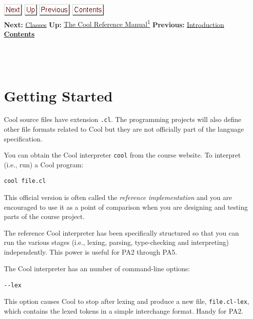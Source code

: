 \documentclass[]{article}
\begin{document}
\href{node4.html}{\includegraphics{next.png}}
\href{cool-manual.html}{\includegraphics{up.png}}
\href{node2.html}{\includegraphics{prev.png}}
\href{node1.html}{\includegraphics{contents.png}} \\ \textbf{Next:}
\href{node4.html}{Classes} \textbf{Up:} \href{cool-manual.html}{The Cool
Reference Manual\textsuperscript{1}} \textbf{Previous:}
\href{node2.html}{Introduction} ~ \textbf{\href{node1.html}{Contents}}
\\ \\

\section{\\ Getting Started}

Cool source files have extension \texttt{.cl}. The programming projects
will also define other file formats related to Cool but they are not
officially part of the language specification.

You can obtain the Cool interpreter \texttt{cool} from the course
website. To interpret (i.e., run) a Cool program:

\begin{verbatim}
cool file.cl 
\end{verbatim}

This official version is often called the \emph{reference
implementation} and you are encouraged to use it as a point of
comparison when you are designing and testing parts of the course
project.

The reference Cool interpreter has been specifically structured so that
you can run the various stages (i.e., lexing, parsing, type-checking and
interpreting) independently. This power is useful for PA2 through PA5.

The Cool interpreter has an number of command-line options:

\texttt{-{}-lex}

This option causes Cool to stop after lexing and produce a new file,
\texttt{file.cl-lex}, which contains the lexed tokens in a simple
interchange format. Handy for PA2.
\end{document}
